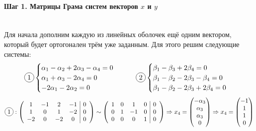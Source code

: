 \documentclass{article}
\newcommand*\circled[1]{\tikz[baseline=(char.base)]{
            \node[shape=circle,draw,inner sep=2pt] (char) {#1};}}
\begin{document}
    \paragraph*{Шаг 1. Матрицы Грама систем векторов $x$ и $y$} \, \\
    Для начала дополним каждую из линейных оболочек ещё одним вектором, который будет ортогонален трём уже заданным. Для этого решим следующие системы:
    $$\circled{1}\begin{cases}
            \alpha_1 - \alpha_2+2\alpha_3-\alpha_4 = 0 \\
            \alpha_1+\alpha_3-2\alpha_4 = 0            \\
            -2\alpha_1-2\alpha_2 = 0
        \end{cases}\qquad \circled{2}\begin{cases}
            \beta_1-\beta_3+2\beta_4=0           \\
            \beta_1-\beta_2-2\beta_3-\beta_4 = 0 \\
            \beta_1-\beta_2-2\beta_3+2\beta_4 = 0
        \end{cases}$$
    $$\circled{1}: \left(\begin{array}{cccc|c}
                1  & -1 & 2  & -1 & 0 \\
                1  & 0  & 1  & -2 & 0 \\
                -2 & 0  & -2 & 0  & 0
            \end{array}\right) \sim \left(\begin{array}{cccc|c}
                1 & 0 & 1  & 0 & 0 \\
                0 & 1 & -1 & 0 & 0 \\
                0 & 0 & 0  & 1 & 0
            \end{array}\right) \Rightarrow x_4=\begin{pmatrix}
            -\alpha_3 \\ \alpha_3 \\ \alpha_3 \\ 0
        \end{pmatrix} \Rightarrow x_4 = \begin{pmatrix}
            -1 \\ 1 \\ 1 \\ 0
        \end{pmatrix}$$
\end{document}

